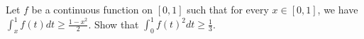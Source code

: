 Let \(f\) be a continuous function on \([0,1]\) such that for every \(x\in [0,1]\),
we have \(\int_{x}^{1}f(t)dt \geq\frac{1-x^{2}}{2}\). Show that \(\int_{0}^{1}f(t)^{2}dt \geq \frac{1}{3}\).